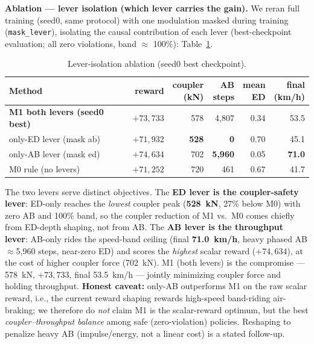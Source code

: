 \documentclass[conference]{IEEEtran}
\begin{document}
\textbf{Ablation --- lever isolation (which lever carries the gain).} We reran
full training (seed0, same protocol) with one modulation masked during
training (\texttt{mask\_lever}), isolating the causal contribution of each
lever (best-checkpoint evaluation; all zero violations, band $\approx$ 100\%):
Table~\ref{tab:ablation}.

\begin{table}[!t]
\centering
\caption{Lever-isolation ablation (seed0 best checkpoint).}
\label{tab:ablation}
\begin{tabular}{@{}l r r r r r@{}}
\toprule
Method & reward & \makecell[c]{coupler\\(kN)} & \makecell[c]{AB\\steps} & \makecell[c]{mean\\ED} & \makecell[c]{final\\(km/h)}\\
\midrule
\textbf{M1 both levers (seed0 best)} & $+73{,}733$ & 578 & 4{,}807 & 0.34 & 53.5\\
only-ED lever (mask ab) & $+71{,}932$ & \textbf{528} & \textbf{0} & 0.70 & 45.1\\
only-AB lever (mask ed) & \textbf{$+74{,}634$} & 702 & \textbf{5{,}960} & 0.05 & \textbf{71.0}\\
M0 rule (no levers) & $+71{,}252$ & 720 & 461 & 0.67 & 41.7\\
\bottomrule
\end{tabular}
\end{table}

The two levers serve distinct objectives. The \textbf{ED lever is the
coupler-safety lever}: ED-only reaches the \emph{lowest} coupler peak
(\textbf{528~kN}, 27\% below M0) with zero AB and 100\% band, so the coupler
reduction of M1 vs.\ M0 comes chiefly from ED-depth shaping, not from AB. The
\textbf{AB lever is the throughput lever}: AB-only rides the speed-band ceiling
(final \textbf{71.0~km/h}, heavy phased AB $\approx$5{,}960 steps, near-zero
ED) and scores the \emph{highest} scalar reward ($+74{,}634$), at the cost of
higher coupler force (702~kN). M1 (both levers) is the compromise --- 578~kN,
$+73{,}733$, final 53.5~km/h --- jointly minimizing coupler force and holding
throughput. \textbf{Honest caveat:} only-AB outperforms M1 on the raw scalar
reward, i.e., the current reward shaping rewards high-speed band-riding
air-braking; we therefore do \emph{not} claim M1 is the scalar-reward optimum,
but the best \emph{coupler--throughput balance} among safe (zero-violation)
policies. Reshaping to penalize heavy AB (impulse/energy, not a linear cost) is
a stated follow-up.
\end{document}
